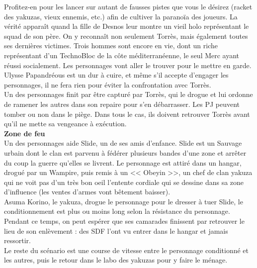 \documentclass[11pt,twoside,a4paper]{article}
\begin{document}
\begin{multicols*}{3}
{Profitez-en pour les lancer sur autant de fausses pistes que vous le d{\'e}sirez (racket des yakuzas, vieux ennemis, etc.) afin de cultiver la parano{\"i}a des joueurs. La v{\'e}rit{\'e} appara{\^i}t quand la fille de Desnos leur montre un vieil holo repr{\'e}sentant le squad de son p{\`e}re. On y reconna{\^i}t non seulement Torr{\`e}s, mais {\'e}galement toutes ses derni{\`e}res victimes. Trois hommes sont encore en vie, dont un riche repr{\'e}sentant d'un TechnoBloc de la c{\^o}te m{\'e}diterran{\'e}enne, le seul Merc ayant r{\'e}ussi socialement. Les personnages vont aller le trouver pour le mettre en garde. Ulysse Papandr{\'e}ous est un dur {\`a} cuire, et m{\^e}me s'il accepte d'engager les personnages, il ne fera rien pour {\'e}viter la confrontation avec Torr{\`e}s.~\\

Un des personnages finit par {\^e}tre captur{\'e} par Torr{\`e}s, qui le drogue et lui ordonne de ramener les autres dans son repaire pour s'en d{\'e}barrasser. Les PJ peuvent tomber ou non dans le pi{\`e}ge. Dans tous le cas, ils doivent retrouver Torr{\`e}s avant qu'il ne mette sa vengeance {\`a} ex{\'e}cution.~\\

\textbf{Zone de feu}~\\

Un des personnages aide Slide, un de ses amis d'enfance. Slide est un Sauvage urbain dont le clan est parvenu {\`a} f{\'e}d{\'e}rer plusieurs bandes d'une zone et arr{\^e}ter du coup la guerre qu'elles se livrent. Le personnage est attir{\'e} dans un hangar, drogu{\'e} par un Wampire, puis remis {\`a} un << Obeyin >>, un chef de clan yakuza qui ne voit pas d'un tr{\`e}s bon oeil l'entente cordiale qui se dessine dans sa zone d'influence (les ventes d'armes vont b{\^e}tement baisser).~\\

Asuma Korino, le yakuza, drogue le personnage pour le dresser {\`a} tuer Slide, le conditionnement est plus ou moins long selon la r{\'e}sistance du personnage. Pendant ce temps, on peut esp{\'e}rer que ses camarades finissent par retrouver le lieu de son enl{\`e}vement : des SDF l'ont vu entrer dans le hangar et jamais ressortir.~\\

Le reste du sc{\'e}nario est une course de vitesse entre le personnage conditionn{\'e} et les autres, puis le retour dans le labo des yakuzas pour y faire le m{\'e}nage.~\\

}
\end{multicols*}
\end{document}
